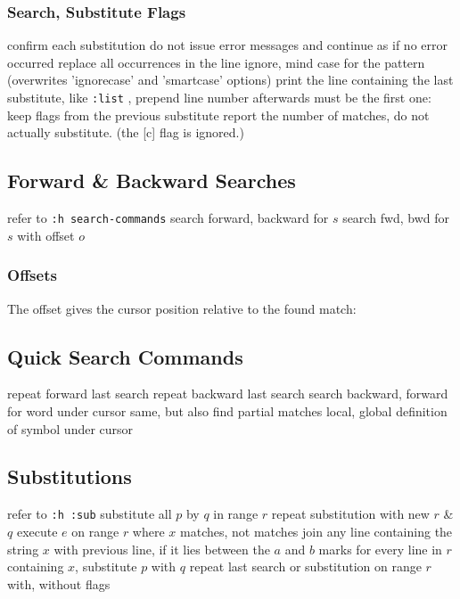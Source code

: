 \subsubsection{Search, Substitute Flags }
	{confirm each substitution}
	{do not issue error messages and continue as if no error occurred}
	{replace all occurrences in the line}
	{ignore, mind case for the pattern (overwrites 'ignorecase' and 'smartcase' options)}
	{print the line containing the last substitute, like {\tt :list} , prepend line number afterwards}
\cmdOper{\&}	{must be the first one: keep flags from the previous substitute}
	{report the number of matches, do not actually substitute.  (the [c] flag is ignored.) }

\subsection{Forward \& Backward Searches}	{refer to {\tt :h search-commands}}
	{search forward, backward for $s$}
	{search fwd, bwd for $s$ with offset $o$}

\subsubsection{Offsets}	{}
The offset gives the cursor position relative to the found match:\\

\subsection{Quick Search Commands}	{}
	{repeat forward last search}
	{repeat backward last search}
\cmdS{\# * }	{search backward, forward for word under cursor}
	{same, but also find partial matches}
	{local, global definition of symbol under cursor}

\subsection{Substitutions}	{refer to {\tt :h :sub}}
	{substitute all $p$ by $q$ in range $r$}
	{repeat substitution with new $r$ \& $q$}
	{execute $e$ on range $r$ where $x$ mat\-ches, not matches}
	{join any line containing the string $x$ with
previous line, if it lies between the $a$ and $b$ marks}
	{for every line in $r$ containing $x$, substitute $p$ with $q$}
	{repeat last search or substitution on range $r$ with, without flags}

